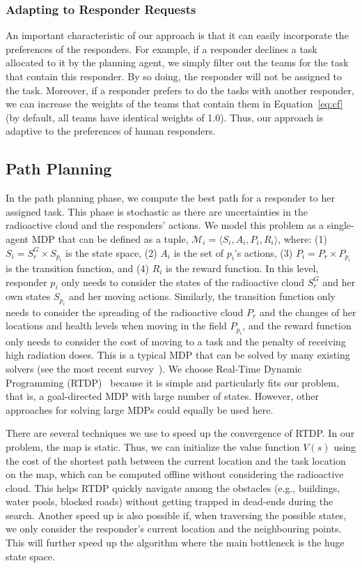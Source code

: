 \subsubsection{Adapting to Responder Requests}\label{sec:adaptive}
\noindent An important characteristic of our approach is that it can easily
incorporate the preferences of the responders. For example, if a
responder declines a task allocated to it by the planning agent, we
simply filter out the teams for the task that contain this
responder. By so doing, the responder will not be assigned to the
task. Moreover, if a responder prefers to do the tasks with another
responder, we can increase the weights of the teams that
contain them in Equation~\ref{eq:cf} (by default, all teams
have identical weights of 1.0). Thus, our approach is adaptive to the
 preferences of human responders.

\subsection{Path Planning}
\label{sec:pathplanning}

\noindent In the path planning phase, we compute the best path for
a responder to her assigned task. This phase is stochastic as there
are uncertainties in the radioactive cloud and the responders'
actions. We model this problem as a single-agent MDP that can be
defined as a tuple, $\mathcal{M}_i = \langle S_i, A_i, P_i, R_i
\rangle$, where: (1) $S_i = S^G_r \times S_{p_i}$ is the state
space, (2) $A_i$ is the set of $p_i$'s actions, (3) $P_i = P_r
\times P_{p_i}$ is the transition function, and (4) $R_i$ is the
reward function. In this level, responder $p_i$ only needs to
consider the states of the radioactive cloud $S^G_r$ and her own
states $S_{p_i}$ and her moving actions. Similarly, the transition
function only needs to consider the spreading of the radioactive
cloud $P_r$ and the changes of her locations and health levels when
moving in the field $P_{p_i}$, and the reward function only needs
to consider the cost of moving to a task and the penalty of
receiving high radiation doses. This is a typical MDP that can be
solved by many existing solvers (see the most recent
survey~\cite{kolobov2012planning}). We choose Real-Time Dynamic
Programming (RTDP)~\cite{barto1995learning} because it is simple
and particularly fits our problem, that is, a goal-directed MDP
with large number of states. However, other approaches for solving
large MDPs  could equally be used here.

There are several techniques we use to speed up the convergence of
RTDP. In our problem, the map is static. Thus, we can initialize
the value function $V(s)$ using the cost of the shortest path
between the current location and the task location on the map, which
can be computed offline without considering the radioactive cloud.
This helps RTDP quickly navigate among the obstacles (e.g.,
buildings, water pools, blocked roads) without getting trapped in
dead-ends during the search. Another speed up is also possible if,
when traversing the possible states, we only consider the
responder's current location and the neighbouring points. This will
further speed up the algorithm where the main bottleneck is the
huge state space.


